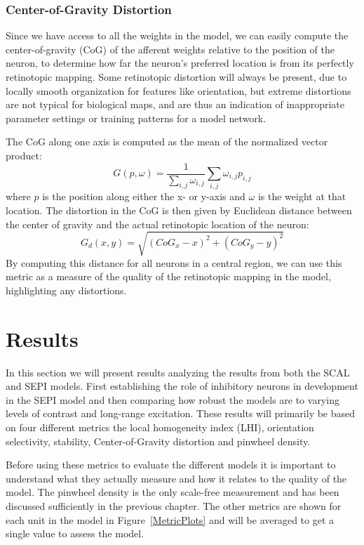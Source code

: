 \subsubsection*{Center-of-Gravity Distortion}

Since we have access to all the weights in the model, we can easily compute
the center-of-gravity (CoG) of the afferent weights relative to the
position of the neuron, to determine how far the neuron's preferred
location is from its perfectly retinotopic mapping.  Some retinotopic
distortion will always be present, due to locally smooth organization
for features like orientation, but extreme distortions are not typical
for biological maps, and are thus an indication of inappropriate
parameter settings or training patterns for a model network.

The CoG along one axis is computed as the mean of the normalized
vector product: 
\begin{equation}
  G(p, \omega) = \frac{1}{\sum_{i,j} \omega_{i, j}} \sum_{i,j} \omega_{i,j} p_{i,j}
\end{equation}
where $p$ is the position along either the x- or y-axis and $\omega$
is the weight at that location. The distortion in the CoG is then
given by Euclidean distance between the center of gravity and the
actual retinotopic location of the neuron:
\begin{equation}
  G_d(x, y) = \sqrt{(CoG_x-x)^2 + (CoG_y-y)^2}
\end{equation}
By computing this distance for all neurons in a central region, we can use
this metric as a measure of the quality of the retinotopic mapping in
the model, highlighting any distortions.

\section{Results}

In this section we will present results analyzing the results from
both the SCAL and SEPI models. First establishing the role of
inhibitory neurons in development in the SEPI model and then comparing
how robust the models are to varying levels of contrast and long-range
excitation. These results will primarily be based on four different
metrics the local homogeneity index (LHI), orientation selectivity,
stability, Center-of-Gravity distortion and pinwheel density.

Before using these metrics to evaluate the different models it is
important to understand what they actually measure and how it relates
to the quality of the model. The pinwheel density is the only
scale-free measurement and has been discussed sufficiently in the
previous chapter. The other metrics are shown for each unit in the
model in Figure~\ref{MetricPlots} and will be averaged to get a single
value to assess the model.

